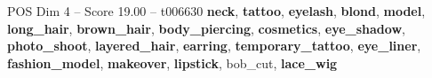 \begin{textsample}{POS Dim 4 – Score 19.00 – t006630}  \label{ex:f4_pos_025}
\textbf{neck}, \textbf{tattoo}, \textbf{eyelash}, \textbf{blond}, \textbf{model}, \textbf{long\_hair}, \textbf{brown\_hair}, \textbf{body\_piercing}, \textbf{cosmetics}, \textbf{eye\_shadow}, \textbf{photo\_shoot}, \textbf{layered\_hair}, \textbf{earring}, \textbf{temporary\_tattoo}, \textbf{eye\_liner}, \textbf{fashion\_model}, \textbf{makeover}, \textbf{lipstick}, bob\_cut, \textbf{lace\_wig}

\end{textsample}
